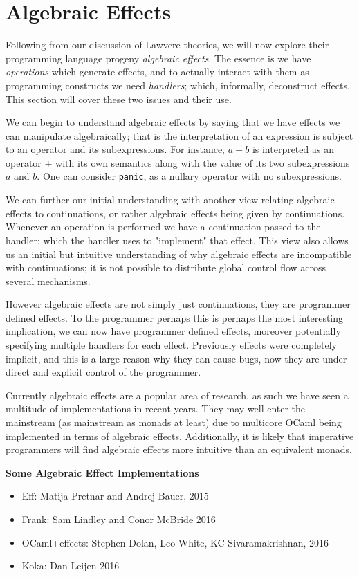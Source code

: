 \section{Algebraic Effects}
Following from our discussion of Lawvere theories,
we will now explore their programming language progeny \textit{algebraic effects}.
The essence is we have \textit{operations} which generate effects,
and to actually interact with them as programming constructs
we need \textit{handlers}\cite{plotkin2009handlers};
which, informally, deconstruct effects.
This section will cover these two issues and their use.

We can begin to understand algebraic effects by saying that
we have effects we can manipulate algebraically;
that is the interpretation of an expression is
subject to an operator and its subexpressions.
For instance, $a + b$ is interpreted as an operator
$+$ with its own semantics along with the value of its
two subexpressions $a$ and $b$.
One can consider \texttt{panic}, as a nullary operator
with no subexpressions.

We can further our initial understanding with another view
relating algebraic effects to continuations,
or rather algebraic effects being given by continuations.
Whenever an operation is performed we have a continuation
passed to the handler;
which the handler uses to "implement" that effect.
This view also allows us an initial but intuitive
understanding of why algebraic effects are incompatible with continuations;
it is not possible to distribute global control flow across several mechanisms.

However algebraic effects are not simply just continuations,
they are programmer defined effects.
To the programmer perhaps this is perhaps the most interesting implication,
we can now have programmer defined effects,
moreover potentially specifying multiple handlers for each effect.
Previously effects were completely implicit,
and this is a large reason why they can cause bugs,
now they are under direct and explicit control of the programmer.

Currently algebraic effects are a popular area of research,
as such we have seen a multitude of implementations in recent years.
They may well enter the mainstream (as mainstream as monads at least)
due to multicore OCaml being implemented in terms of algebraic effects.
Additionally, it is likely that imperative programmers
will find algebraic effects more intuitive than an equivalent monads.

\textbf{Some Algebraic Effect Implementations}
\begin{itemize}
    \item Eff: Matija Pretnar and Andrej Bauer,
        2015\cite{bauer2015programming}
    \item Frank: Sam Lindley and Conor McBride
        2016\cite{Lindley:2016vz}
    \item OCaml+effects: Stephen Dolan, Leo White, KC Sivaramakrishnan,
        2016\cite{ocamlplseff}
    \item Koka: Dan Leijen
        2016\cite{leijen:16}
\end{itemize}


